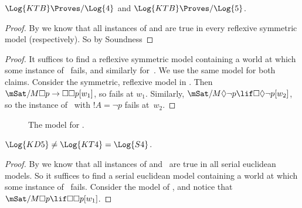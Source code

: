\documentclass[../../../include/open-logic-section]{subfiles}
\begin{document}
\begin{thm}
  $\Log{KTB} \Proves/ \Log{4}$ and $\Log{KTB} \Proves/ \Log{5}$.
\end{thm}

\begin{proof}
  By  we know that all instances of
   and  are true in every reflexive symmetric model
  (respectively). So by Soundness
\end{proof}

\begin{proof}
  It suffices to find a reflexive symmetric model containing a world
  at which some instance of~ fails, and similarly for~.
  We use the same model for both claims. Consider the symmetric,
  reflexive model in .  Then $\mSat/{M}{\Box p \to
    \Box \Box p}[w_1]$, so  fails at $w_1$. Similarly,
  $\mSat/{M}{\Diamond \lnot p \lif \Box \Diamond \lnot p}[w_2]$, so
  the instance of~ with $!A = \lnot p$ fails at~$w_2$.
\end{proof}

\begin{figure}[htpb]
  \centering
  \caption{The model for .}
\end{figure}

\begin{thm}
  $\Log{KD5} \neq \Log{KT4} = \Log{S4}$.
\end{thm}

\begin{proof}
  By  we know that all instances of
   and~ are true in all serial euclidean models.
  So  it suffices to find a serial euclidean model containing a world
  at which some instance of~ fails.  Consider the model of
  , and notice that $\mSat/{M}{\Box p
  \lif \Box\Box p}[w_1]$. 
\end{proof}
\end{document}
